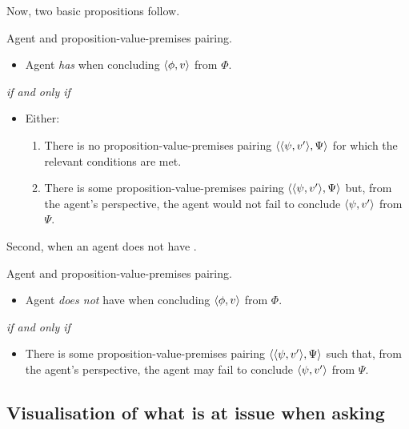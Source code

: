\begin{note}
  Now, two basic propositions follow.
  \begin{proposition}
    Agent and proposition-value-premises pairing.

    \begin{itemize}
    \item
      Agent \emph{has} \zS{} when concluding \(\langle \phi, v \rangle\) from \(\Phi\).
    \end{itemize}

    \emph{if and only if}

    \begin{itemize}
    \item
      Either:
      \begin{enumerate}[label=(\alph*), ref=\alph*]
      \item
        There is no proposition-value-premises pairing \(\langle \langle \psi, v' \rangle, \Psi \rangle\) for which the relevant conditions are met.
      \item
        There is some proposition-value-premises pairing \(\langle \langle \psi, v' \rangle, \Psi \rangle\) but, from the agent's perspective, the agent would not fail to conclude \(\langle \psi, v' \rangle\) from \(\Psi\).
      \end{enumerate}
    \end{itemize}
  \end{proposition}

  Second, when an agent does not have \zS{}.

  \begin{proposition}
    Agent and proposition-value-premises pairing.
    \begin{itemize}
    \item
      Agent \emph{does not} have \zS{} when concluding \(\langle \phi, v \rangle\) from \(\Phi\).
    \end{itemize}

    \emph{if and only if}

    \begin{itemize}
    \item
      There is some proposition-value-premises pairing \(\langle \langle \psi, v' \rangle, \Psi \rangle\) such that, from the agent's perspective, the agent may fail to conclude \(\langle \psi, v' \rangle\) from \(\Psi\).
    \end{itemize}
  \end{proposition}
\end{note}

\subsection[Visualisation]{Visualisation of what is at issue when asking \qzS{}}

